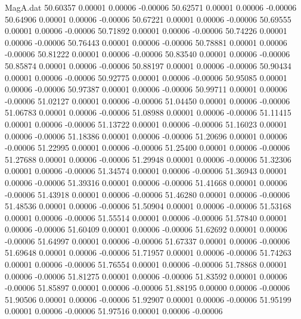 \begin{filecontents}{MagA.dat}
  50.60357    0.00001    0.00006   -0.00006
  50.62571    0.00001    0.00006   -0.00006
  50.64906    0.00001    0.00006   -0.00006
  50.67221    0.00001    0.00006   -0.00006
  50.69555    0.00001    0.00006   -0.00006
  50.71892    0.00001    0.00006   -0.00006
  50.74226    0.00001    0.00006   -0.00006
  50.76443    0.00001    0.00006   -0.00006
  50.78881    0.00001    0.00006   -0.00006
  50.81222    0.00001    0.00006   -0.00006
  50.83540    0.00001    0.00006   -0.00006
  50.85874    0.00001    0.00006   -0.00006
  50.88197    0.00001    0.00006   -0.00006
  50.90434    0.00001    0.00006   -0.00006
  50.92775    0.00001    0.00006   -0.00006
  50.95085    0.00001    0.00006   -0.00006
  50.97387    0.00001    0.00006   -0.00006
  50.99711    0.00001    0.00006   -0.00006
  51.02127    0.00001    0.00006   -0.00006
  51.04450    0.00001    0.00006   -0.00006
  51.06783    0.00001    0.00006   -0.00006
  51.08988    0.00001    0.00006   -0.00006
  51.11415    0.00001    0.00006   -0.00006
  51.13722    0.00001    0.00006   -0.00006
  51.16023    0.00001    0.00006   -0.00006
  51.18386    0.00001    0.00006   -0.00006
  51.20696    0.00001    0.00006   -0.00006
  51.22995    0.00001    0.00006   -0.00006
  51.25400    0.00001    0.00006   -0.00006
  51.27688    0.00001    0.00006   -0.00006
  51.29948    0.00001    0.00006   -0.00006
  51.32306    0.00001    0.00006   -0.00006
  51.34574    0.00001    0.00006   -0.00006
  51.36943    0.00001    0.00006   -0.00006
  51.39316    0.00001    0.00006   -0.00006
  51.41668    0.00001    0.00006   -0.00006
  51.43918    0.00001    0.00006   -0.00006
  51.46280    0.00001    0.00006   -0.00006
  51.48536    0.00001    0.00006   -0.00006
  51.50904    0.00001    0.00006   -0.00006
  51.53168    0.00001    0.00006   -0.00006
  51.55514    0.00001    0.00006   -0.00006
  51.57840    0.00001    0.00006   -0.00006
  51.60409    0.00001    0.00006   -0.00006
  51.62692    0.00001    0.00006   -0.00006
  51.64997    0.00001    0.00006   -0.00006
  51.67337    0.00001    0.00006   -0.00006
  51.69648    0.00001    0.00006   -0.00006
  51.71957    0.00001    0.00006   -0.00006
  51.74263    0.00001    0.00006   -0.00006
  51.76554    0.00001    0.00006   -0.00006
  51.78868    0.00001    0.00006   -0.00006
  51.81275    0.00001    0.00006   -0.00006
  51.83592    0.00001    0.00006   -0.00006
  51.85897    0.00001    0.00006   -0.00006
  51.88195    0.00000    0.00006   -0.00006
  51.90506    0.00001    0.00006   -0.00006
  51.92907    0.00001    0.00006   -0.00006
  51.95199    0.00001    0.00006   -0.00006
  51.97516    0.00001    0.00006   -0.00006

\end{filecontents}
